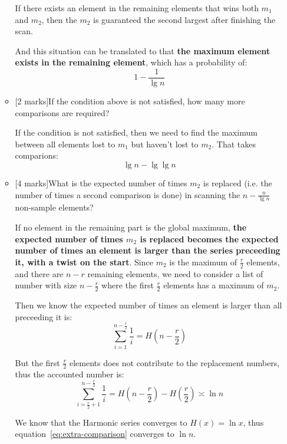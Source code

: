 \documentclass[12pt]{article}
\begin{document}
\begin{enumerate}
\begin{itemize}
If there exists an element in the remaining elements that wins both $m_{1}$ and $m_{2}$, then the $m_{2}$ is guaranteed the second largest after finishing the scan.

And this situation can be translated to that \textbf{the maximum element exists in the remaining element}, which has a probability of:
\begin{equation}
1 - \frac{1}{\lg n}
\end{equation}

\item{}[2 marks]If the condition above is not satisfied, how many more comparisons are required?

If the condition is not satisfied, then we need to find the maximum between all elements lost to $m_{1}$ but haven't lost to $m_{2}$. That takes comparions:
\begin{equation}
\lg n - \lg \lg n
\end{equation}

\item{}[4 marks]What is the expected number of times $m_{2}$ is replaced (i.e. the number of times a second comparison is done) in scanning the $n-\frac{n}{\lg n}$ non-sample elements?

If no element in the remaining part is the global maximum, \textbf{the expected number of times $m_{2}$ is replaced becomes the expected number of times an element is larger than the series preceeding it, with a twist on the start}. Since $m_{2}$ is the maximum of $\frac{r}{2}$ elements, and there are $n - r$ remaining elements, we need to consider a list of number with size $n - \frac{r}{2}$ where the first $\frac{r}{2}$ elements has a maximum of $m_{2}$.

Then we know the expected number of times an element is larger than all preceeding it is:
\begin{equation}
\sum_{i = 1}^{n - \frac{r}{2}}\frac{1}{i} = H(n - \frac{r}{2})
\end{equation}

But the first $\frac{r}{2}$ elements does not contribute to the replacement numbers, thus the accounted number is:
\begin{equation} \label{eq:extra-comparison}
\sum_{i = \frac{r}{2} + 1}^{n - \frac{r}{2}}\frac{1}{i} = H(n - \frac{r}{2}) - H(\frac{r}{2}) \asymp \ln n
\end{equation}

We know that the Harmonic series converges to $H(x) = \ln x$, thus equation~\ref{eq:extra-comparison} converges to $\ln n$.


\end{itemize}
\end{enumerate}
\end{document}
